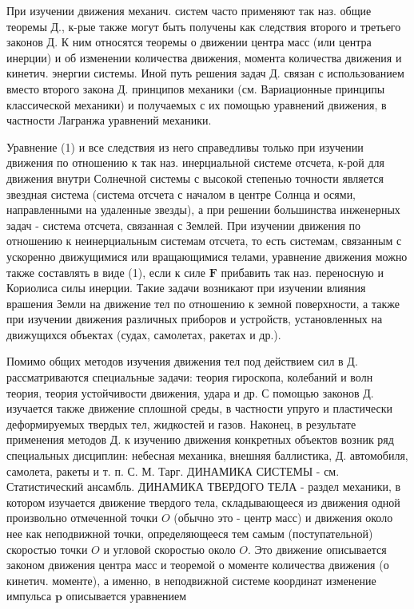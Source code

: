 \documentclass[10pt]{article}
\begin{document}
При изучении движения механич. систем часто применяют так наз. общие теоремы Д., к-рые также могут быть получены как следствия второго и третьего законов Д. К ним относятся теоремы о движении центра масс (или центра инерции) и об изменении количества движения, момента количества движения и кинетич. энергии системы. Иной путь решения задач Д. связан с использованием вместо второго закона Д. принципов механики (см. Вариационные принципы классической механики) и получаемых с их помощью уравнений движения, в частности Лагранжа уравнений механики.



Уравнение (1) и все следствия из него справедливы только при изучении движения по отношению к так наз. инерциальной системе отсчета, к-рой для движения внутри Солнечной системы с высокой степенью точности является звездная система (система отсчета с началом в центре Солнца и осями, направленными на удаленные звезды), а при решении большинства инженерных задач - система отсчета, связанная с Землей. При изучении движения по отношению к неинерциальным системам отсчета, то есть системам, связанным с ускоренно движущимися или вращающимися телами, уравнение движения можно также составлять в виде (1), если к силе $\boldsymbol{F}$ прибавить так наз. переносную и Кориолиса силы инерции. Такие задачи возникают при изучении влияния врашения Земли на движение тел по отношению к земной поверхности, а также при изучении движения различных приборов и устройств, установленных на движущихся объектах (судах, самолетах, ракетах и др.).



Помимо общих методов изучения движения тел под действием сил в Д. рассматриваются специальные задачи: теория гироскопа, колебаний и волн теория, теория устойчивости движения, удара и др. С помощью законов Д. изучается также движение сплошной среды, в частности упруго и пластически деформируемых твердых тел, жидкостей и газов. Наконец, в результате применения методов Д. к изучению движения конкретных объектов возник ряд специальных дисциплин: небесная механика, внешняя баллистика, Д. автомобиля, самолета, ракеты и т. п. С. М. Тарг. ДИНАМИКА СИСТЕМЫ - см. Статистический ансамбль. ДИНАМИКА ТВЕРДОГО ТЕЛА - раздел механики, в котором изучается движение твердого тела, складывающееся из движения одной произвольно отмеченной точки $O$ (обычно это - центр масс) и движения около нее как неподвижной точки, определяющееся тем самым (поступательной) скоростью точки $O$ и угловой скоростью около $O$. Это движение описывается законом движения центра масс и теоремой о моменте количества движения (о кинетич. моменте), а именно, в неподвижной системе координат изменение импульса $\boldsymbol{p}$ описывается уравнением
\end{document}
